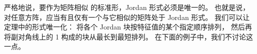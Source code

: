


\begin{remark}
严格地说，要作为矩阵相似
的标准形，Jordan 形式必须是唯一的。
也就是说，对任意方阵，应当有且仅有一个与它相似的矩阵处于
Jordan 形式。
我们可以让定理中的形式唯一化：
将各个 Jordan 块按特征值的某个指定顺序排列，
然后再将副对角线上的 1 构成的块从最长到最短排列。
在下面的例子中，我们不讨论这一点。
\end{remark}

